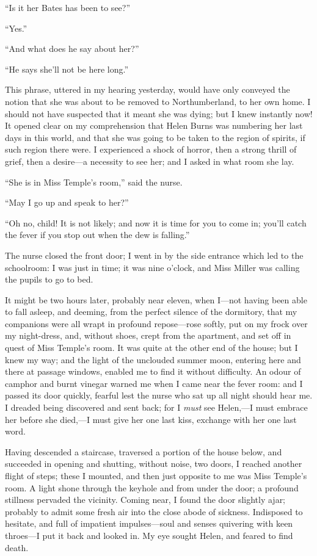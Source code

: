 \enquote{Is it her \Mr{} Bates has been to see?}

\enquote{Yes.}

\enquote{And what does he say about her?}

\enquote{He says she'll not be here long.}

This phrase, uttered in my hearing yesterday, would have only conveyed
the notion that she was about to be removed to Northumberland, to her
own home. I should not have suspected that it meant she was dying; but
I knew instantly now! It opened clear on my comprehension that Helen
Burns was numbering her last days in this world, and that she was going
to be taken to the region of spirits, if such region there were. I
experienced a shock of horror, then a strong thrill of grief, then a
desire---a necessity to see her; and I asked in what room she lay.

\enquote{She is in Miss Temple's room,} said the nurse.

\enquote{May I go up and speak to her?}

\enquote{Oh no, child! It is not likely; and now it is time for you to
come in; you'll catch the fever if you stop out when the dew is
falling.}

The nurse closed the front door; I went in by the side entrance which
led to the schoolroom: I was just in time; it was nine o'clock, and Miss
Miller was calling the pupils to go to bed.

It might be two hours later, probably near eleven, when I---not having
been able to fall asleep, and deeming, from the perfect silence of the
dormitory, that my companions were all wrapt in profound repose---rose
softly, put on my frock over my night-dress, and, without shoes, crept
from the apartment, and set off in quest of Miss Temple's room. It was
quite at the other end of the house; but I knew my way; and the light of
the unclouded summer moon, entering here and there at passage windows,
enabled me to find it without difficulty. An odour of camphor and burnt
vinegar warned me when I came near the fever room: and I passed its door
quickly, fearful lest the nurse who sat up all night should hear me. I
dreaded being discovered and sent back; for I \emph{must} see Helen,---I
must embrace her before she died,---I must give her one last kiss,
exchange with her one last word.

Having descended a staircase, traversed a portion of the house below,
and succeeded in opening and shutting, without noise, two doors, I
reached another flight of steps; these I mounted, and then just opposite
to me was Miss Temple's room. A light shone through the keyhole and
from under the door; a profound stillness pervaded the vicinity. Coming
near, I found the door slightly ajar; probably to admit some fresh air
into the close abode of sickness. Indisposed to hesitate, and full of
impatient impulses---soul and senses quivering with keen throes---I put
it back and looked in. My eye sought Helen, and feared to find death.

